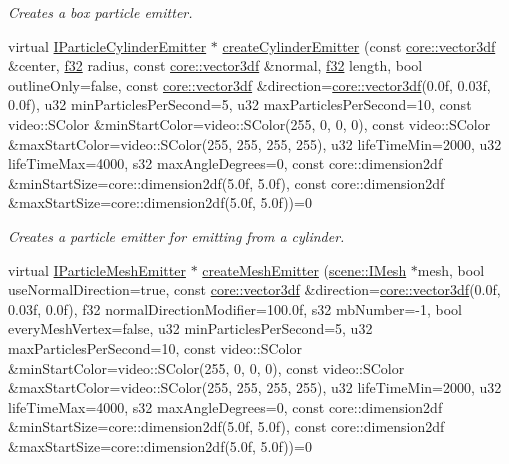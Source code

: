\begin{DoxyCompactItemize}
\begin{DoxyCompactList}\small\item\em Creates a box particle emitter. \end{DoxyCompactList}\item 
virtual \hyperlink{classirr_1_1scene_1_1IParticleCylinderEmitter}{I\+Particle\+Cylinder\+Emitter} $\ast$ \hyperlink{classirr_1_1scene_1_1IParticleSystemSceneNode_a191550f97d9f8a1ac7c6fefd78d84bf5}{create\+Cylinder\+Emitter} (const \hyperlink{namespaceirr_1_1core_ae6e2b2a6c552833ebbd5b7463d03586b}{core\+::vector3df} \&center, \hyperlink{namespaceirr_a0277be98d67dc26ff93b1a6a1d086b07}{f32} radius, const \hyperlink{namespaceirr_1_1core_ae6e2b2a6c552833ebbd5b7463d03586b}{core\+::vector3df} \&normal, \hyperlink{namespaceirr_a0277be98d67dc26ff93b1a6a1d086b07}{f32} length, bool outline\+Only=false, const \hyperlink{namespaceirr_1_1core_ae6e2b2a6c552833ebbd5b7463d03586b}{core\+::vector3df} \&direction=\hyperlink{namespaceirr_1_1core_ae6e2b2a6c552833ebbd5b7463d03586b}{core\+::vector3df}(0.\+0f, 0.\+03f, 0.\+0f), u32 min\+Particles\+Per\+Second=5, u32 max\+Particles\+Per\+Second=10, const video\+::\+S\+Color \&min\+Start\+Color=video\+::\+S\+Color(255, 0, 0, 0), const video\+::\+S\+Color \&max\+Start\+Color=video\+::\+S\+Color(255, 255, 255, 255), u32 life\+Time\+Min=2000, u32 life\+Time\+Max=4000, s32 max\+Angle\+Degrees=0, const core\+::dimension2df \&min\+Start\+Size=core\+::dimension2df(5.\+0f, 5.\+0f), const core\+::dimension2df \&max\+Start\+Size=core\+::dimension2df(5.\+0f, 5.\+0f))=0
\begin{DoxyCompactList}\small\item\em Creates a particle emitter for emitting from a cylinder. \end{DoxyCompactList}\item 
virtual \hyperlink{classirr_1_1scene_1_1IParticleMeshEmitter}{I\+Particle\+Mesh\+Emitter} $\ast$ \hyperlink{classirr_1_1scene_1_1IParticleSystemSceneNode_a7e08b7e74a5295fd167769d5ee5a5161}{create\+Mesh\+Emitter} (\hyperlink{classirr_1_1scene_1_1IMesh}{scene\+::\+I\+Mesh} $\ast$mesh, bool use\+Normal\+Direction=true, const \hyperlink{namespaceirr_1_1core_ae6e2b2a6c552833ebbd5b7463d03586b}{core\+::vector3df} \&direction=\hyperlink{namespaceirr_1_1core_ae6e2b2a6c552833ebbd5b7463d03586b}{core\+::vector3df}(0.\+0f, 0.\+03f, 0.\+0f), f32 normal\+Direction\+Modifier=100.\+0f, s32 mb\+Number=-\/1, bool every\+Mesh\+Vertex=false, u32 min\+Particles\+Per\+Second=5, u32 max\+Particles\+Per\+Second=10, const video\+::\+S\+Color \&min\+Start\+Color=video\+::\+S\+Color(255, 0, 0, 0), const video\+::\+S\+Color \&max\+Start\+Color=video\+::\+S\+Color(255, 255, 255, 255), u32 life\+Time\+Min=2000, u32 life\+Time\+Max=4000, s32 max\+Angle\+Degrees=0, const core\+::dimension2df \&min\+Start\+Size=core\+::dimension2df(5.\+0f, 5.\+0f), const core\+::dimension2df \&max\+Start\+Size=core\+::dimension2df(5.\+0f, 5.\+0f))=0

\end{DoxyCompactItemize}
